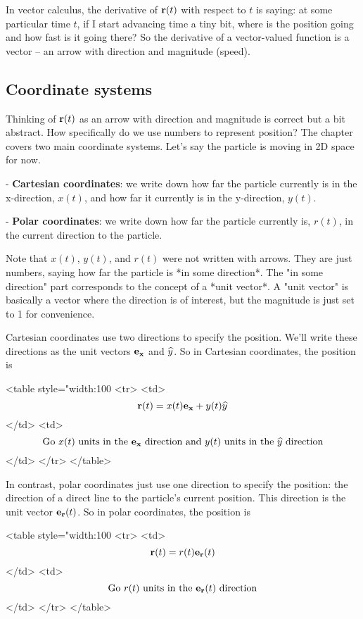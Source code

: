 In vector calculus, the derivative of $\mathbf{r}(t)$ with respect to $t$ is saying: at
some particular time $t$, if I start advancing time a tiny bit, where is the
position going and how fast is it going there? So the derivative of a
vector-valued function is a vector -- an arrow with direction and magnitude
(speed).


\subsection{Coordinate systems}

Thinking of $\mathbf{r}(t)$ as an arrow with direction and magnitude is correct but a
bit abstract. How specifically do we use numbers to represent position? The
chapter covers two main coordinate systems. Let's say the particle is moving in
2D space for now.

- \textbf{Cartesian coordinates}: we write down how far the particle currently is in
  the x-direction, $x(t)$, and how far it currently is in the y-direction,
  $y(t)$.

- \textbf{Polar coordinates}: we write down how far the particle currently is,
  $r(t)$, in the current direction to the particle.

Note that $x(t)$, $y(t)$, and $r(t)$ were not written with arrows. They are
just numbers, saying how far the particle is *in some direction*. The "in some
direction" part corresponds to the concept of a *unit vector*. A "unit vector"
is basically a vector where the direction is of interest, but the magnitude is
just set to 1 for convenience.

Cartesian coordinates use two directions to specify the position. We'll write
these directions as the unit vectors $\mathbf{e_x}$ and $\widehat{y}$. So in Cartesian
coordinates, the position is

<table style="width:100%
  <tr>
    <td> $$\mathbf{r}(t) = x(t)\mathbf{e_x} + y(t)\widehat{y}$$ </td>
    <td> $$\mathrm{Go~} x(t) \mathrm{~units~in~the~} \mathbf{e_x} \mathrm{~direction} \mathrm{~and~} y(t) \mathrm{~units~in~the~} \widehat{y} \mathrm{~direction}$$ </td>
  </tr>
</table>

In contrast, polar coordinates just use one direction to specify the position:
the direction of a direct line to the particle's current position. This
direction is the unit vector $\mathbf{e_r}(t)$. So in polar
coordinates, the position is


<table style="width:100%
  <tr>
    <td> $$\mathbf{r}(t) = r(t)\mathbf{e_r}(t)$$ </td>
    <td> $$\mathrm{Go~} r(t) \mathrm{~units~in~the~} \mathbf{e_r}(t) \mathrm{~direction}$$ </td>
  </tr>
</table>


